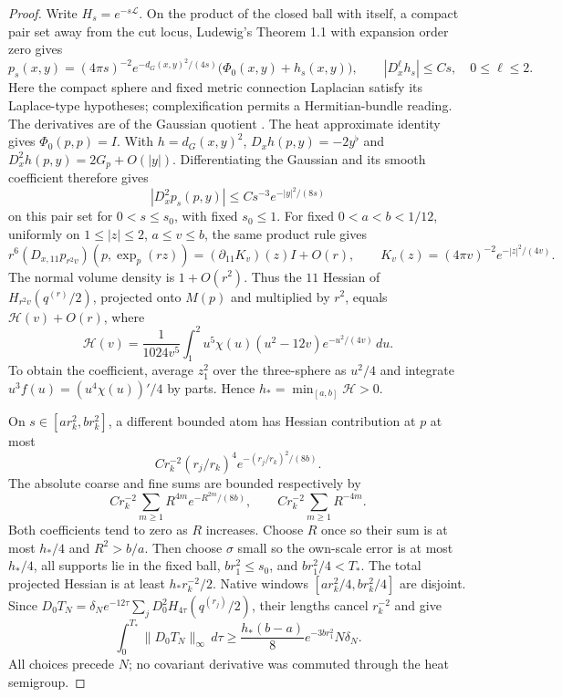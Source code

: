 \documentclass[11pt]{article}
\numberwithin{equation}{section}
\theoremstyle{definition}
\theoremstyle{remark}
\begin{document}
\begin{proof}
Write \(H_s=e^{-s\mathcal L}\).
On the product of the closed ball with itself, a compact
pair set away from the cut locus, Ludewig's Theorem 1.1 with expansion order zero gives
\[
 p_s(x,y)=(4\pi s)^{-2}e^{-d_G(x,y)^2/(4s)}
                       \bigl(\Phi_0(x,y)+h_s(x,y)\bigr),
 \qquad |D_x^\ell h_s|\le Cs,\quad 0\le\ell\le2 .
\]
Here the compact sphere and fixed metric connection Laplacian
satisfy its Laplace-type hypotheses; complexification permits
a Hermitian-bundle reading.
The derivatives are of the Gaussian quotient
\cite[Theorem 1.1 and \S2]{Ludewig2019}.
The heat approximate identity gives \(\Phi_0(p,p)=I\).
With \(h=d_G(x,y)^2\),
\(D_xh(p,y)=-2y^\flat\) and
\(D_x^2h(p,y)=2G_p+O(|y|)\). Differentiating the Gaussian
and its smooth coefficient therefore gives
\[
 |D_x^2p_s(p,y)|\le Cs^{-3}e^{-|y|^2/(8s)}
\]
on this pair set for \(0<s\le s_0\), with fixed \(s_0\le1\).
For fixed \(0<a<b<1/12\), uniformly on \(1\le|z|\le2\),
\(a\le v\le b\), the same product rule gives
\[
 r^6(D_{x,11}p_{r^2v})(p,\exp_p(rz))
   =(\partial_{11}K_v)(z)I+O(r),\qquad
 K_v(z)=(4\pi v)^{-2}e^{-|z|^2/(4v)} .
\]
The normal volume density is \(1+O(r^2)\).
Thus the \(11\) Hessian of \(H_{r^2v}(q^{(r)}/2)\),
projected onto \(M(p)\) and multiplied by \(r^2\), equals
\(\mathcal H(v)+O(r)\), where
\[
 \mathcal H(v)=\frac1{1024v^5}
   \int_1^2 u^5\chi(u)(u^2-12v)e^{-u^2/(4v)}\,du .
\]
To obtain the coefficient, average \(z_1^2\) over the
three-sphere as \(u^2/4\) and integrate
\(u^3f(u)=(u^4\chi(u))'/4\) by parts.
Hence \(h_*=\min_{[a,b]}\mathcal H>0\).

On \(s\in[ar_k^2,br_k^2]\), a different bounded atom has
Hessian contribution at \(p\) at most
\[
 C r_k^{-2}(r_j/r_k)^4
                 e^{-(r_j/r_k)^2/(8b)} .
\]
The absolute coarse and fine sums are bounded respectively by
\[
 C r_k^{-2}\sum_{m\ge1}R^{4m}e^{-R^{2m}/(8b)},
 \qquad
 C r_k^{-2}\sum_{m\ge1}R^{-4m}.
\]
Both coefficients tend to zero as \(R\) increases.
Choose \(R\) once so their sum is at most \(h_*/4\)
and \(R^2>b/a\). Then choose \(\sigma\) small so the
own-scale error is at most \(h_*/4\), all supports lie in
the fixed ball, \(br_1^2\le s_0\), and \(br_1^2/4<T_*\).
The total projected Hessian is at least \(h_*r_k^{-2}/2\).
Native windows \([ar_k^2/4,br_k^2/4]\) are disjoint.
Since \(D_0T_N=\delta_N e^{-12\tau}
 \sum_jD_0^2H_{4\tau}(q^{(r_j)}/2)\),
their lengths cancel \(r_k^{-2}\) and give
\[
 \int_0^{T_*}\|D_0T_N\|_\infty\,d\tau
 \ge \frac{h_*(b-a)}8 e^{-3br_1^2}N\delta_N .
\]
All choices precede \(N\); no covariant derivative was
commuted through the heat semigroup.


\end{proof}
\end{document}
